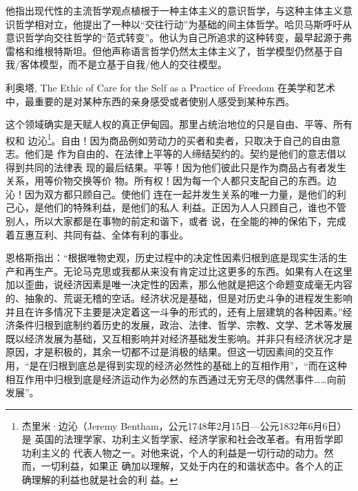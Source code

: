 他指出现代性的主流哲学观点植根于一种主体主义的意识哲学，与这种主体主义意识哲学相对立，他提出了一种以“交往行动”为基础的间主体哲学。哈贝马斯呼吁从意识哲学向交往哲学的“范式转变”。他认为自己所追求的这种转变，最早起源于弗雷格和维根特斯坦。但他声称语言哲学仍然太主体主义了，哲学模型仍然基于自我/客体模型，而不是立基于自我/他人的交往模型。

利奥塔, The Ethic of Care for the Self as a Practice of Freedom 在美学和艺术中，最重要的是对某种东西的亲身感受或者使别人感受到某种东西。




这个领域确实是天赋人权的真正伊甸园。那里占统治地位的只是自由、平等、所有权和
边沁\footnote{杰里米·边沁（Jeremy Bentham，公元1748年2月15日—公元1832年6月6日）是
  英国的法理学家、功利主义哲学家、经济学家和社会改革者。有用哲学即功利主义的
  代表人物之一。对他来说，个人的利益是一切行动的动力。然而，一切利益，如果正
  确加以理解，又处于内在的和谐状态中。各个人的正确理解的利益也就是社会的利
  益。}。自由！因为商品例如劳动力的买者和卖者，只取决于自己的自由意志。他们是
作为自由的、在法律上平等的人缔结契约的。契约是他们的意志借以得到共同的法律表
现的最后结果。平等！因为他们彼此只是作为商品占有者发生关系，用等价物交换等价
物。所有权！因为每一个人都只支配自己的东西。边沁！因为双方都只顾自己。使他们
连在一起并发生关系的唯一力量，是他们的利己心，是他们的特殊利益，是他们的私人
利益。正因为人人只顾自己，谁也不管别人，所以大家都是在事物的前定和谐下，或者
说，在全能的神的保佑下，完成着互惠互利、共同有益、全体有利的事业。

恩格斯指出：“根据唯物史观，历史过程中的决定性因素归根到底是现实生活的生产和再生产。无论马克思或我都从来没有肯定过比这更多的东西。如果有人在这里加以歪曲，说经济因素是唯一决定性的因素，那么他就是把这个命题变成毫无内容的、抽象的、荒诞无稽的空话。经济状况是基础，但是对历史斗争的进程发生影响并且在许多情况下主要是决定着这一斗争的形式的，还有上层建筑的各种因素。”经济条件归根到底制约着历史的发展，政治、法律、哲学、宗教、文学、艺术等发展既以经济发展为基础，又互相影响并对经济基础发生影响。并非只有经济状况才是原因，才是积极的，其余一切都不过是消极的结果。但这一切因素间的交互作用，“是在归根到底总是得到实现的经济必然性的基础上的互相作用”，“而在这种相互作用中归根到底是经济运动作为必然的东西通过无穷无尽的偶然事件……向前发展”。
